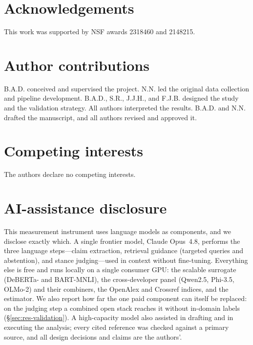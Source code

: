 \documentclass[11pt]{article}
\begin{document}
\section*{Acknowledgements}
This work was supported by NSF awards 2318460 and 2148215.

\section*{Author contributions}
B.A.D. conceived and supervised the project. N.N. led the original data collection and pipeline
development. B.A.D., S.R., J.J.H., and F.J.B. designed the study and the validation strategy. All authors
interpreted the results. B.A.D. and N.N. drafted the manuscript, and all authors revised and approved it.

\section*{Competing interests}
The authors declare no competing interests.

\section*{AI-assistance disclosure}
This measurement instrument uses language models as components, and we disclose exactly which. A single
frontier model, Claude Opus~4.8, performs the three language steps---claim extraction,
retrieval guidance (targeted queries and abstention), and stance judging---used in context without
fine-tuning. Everything else is free and runs locally on a single consumer GPU: the scalable surrogate
(DeBERTa- and BART-MNLI), the cross-developer panel (Qwen2.5, Phi-3.5, OLMo-2) and their combiners, the
OpenAlex and Crossref indices, and the estimator. We also report how far the one paid component can
itself be replaced: on the judging step a combined open stack reaches it without in-domain labels
(\S\ref{sec:res-validation}). A high-capacity model also assisted in drafting and in executing the
analysis; every cited reference was checked against a primary source, and all design decisions and claims
are the authors'.


\end{document}
